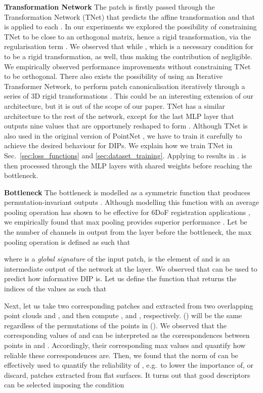 \documentclass[a4paper,conference]{IEEEtran}
\begin{document}
\vspace{1mm}
\noindent \textbf{Transformation Network} 
The patch  is firstly passed through the Transformation Network (TNet) that predicts the affine transformation  and that is applied to each .
In our experiments we explored the possibility of constraining TNet to be close to an orthogonal matrix, hence a rigid transformation, via the regularisation term  \cite{Qi2017a,Huynh2009}.
We observed that while , which is a necessary condition for  to be a rigid transformation,  as well, thus making the contribution of  negligible.
We empirically observed performance improvements without constraining TNet to be orthogonal.
There also exists the possibility of using an Iterative Transformer Network, to perform patch canonicalisation iteratively through a series of 3D rigid transformations \cite{Yuan2019}. 
This could be an interesting extension of our architecture, but it is out of the scope of our paper.
TNet has a similar architecture to the rest of the network, except for the last MLP layer that outputs nine values that are opportunely reshaped to form .
Although TNet is also used in the original version of PointNet \cite{Qi2017a}, we have to train it carefully to achieve the desired behaviour for DIPs.
We explain how we train TNet in Sec.~\ref{sec:loss_functions} and \ref{sec:dataset_training}.
Applying  to  results in . 
 is then processed through the MLP layers with shared weights before reaching the bottleneck.

\vspace{.1cm}
\noindent \textbf{Bottleneck} 
The bottleneck is modelled as a symmetric function that produces permutation-invariant outputs \cite{Qi2017a}. 
Although modelling this function with an average pooling operation has shown to be effective for 6DoF registration applications \cite{Wang2019}, we empirically found that max pooling provides superior performance \cite{Qi2017a}. 
Let  be the number of channels in output from the layer before the bottleneck, the max pooling operation is defined as  such that

where  is a \emph{global signature} of the input patch,  is the  element of  and  is an intermediate output of the network at the  layer.
We observed that  can be used to predict how informative DIP is.
Let us define the function that returns the indices of the  values as  such that 

Next, let us take two corresponding patches  and  extracted from two overlapping point clouds  and , and then compute , and , respectively. 
 () will be the same regardless of the permutations of the points in  ().
We observed that the corresponding values of  and  can be interpreted as the correspondences between points in  and .
Accordingly, their corresponding max values  and  quantify how reliable these correspondences are.
Then, we found that the norm of  can be effectively used to quantify the reliability of , e.g.~to lower the importance of, or discard, patches extracted from flat surfaces.
It turns out that good descriptors can be selected imposing the condition
\end{document}
